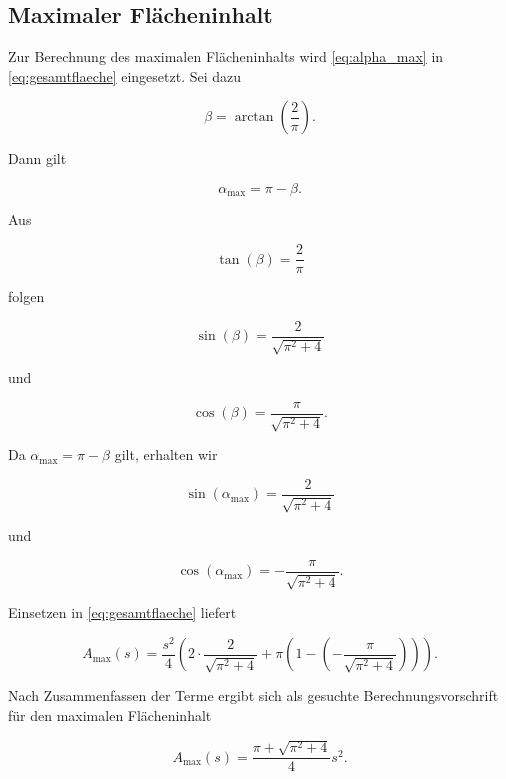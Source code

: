 \subsection{Maximaler Flächeninhalt}

Zur Berechnung des maximalen Flächeninhalts wird
\eqref{eq:alpha_max} in \eqref{eq:gesamtflaeche} eingesetzt. Sei dazu

\begin{equation}
    \beta
    =
    \arctan\left(\frac{2}{\pi}\right).
\end{equation}

Dann gilt

\begin{equation}
    \alpha_{\max}
    =
    \pi-\beta.
\end{equation}

Aus

\begin{equation}
    \tan(\beta)=\frac{2}{\pi}
\end{equation}

folgen

\begin{equation}
    \sin(\beta)
    =
    \frac{2}{\sqrt{\pi^2+4}}
\end{equation}

und

\begin{equation}
    \cos(\beta)
    =
    \frac{\pi}{\sqrt{\pi^2+4}}.
\end{equation}

Da \(\alpha_{\max}=\pi-\beta\) gilt, erhalten wir

\begin{equation}
    \sin(\alpha_{\max})
    =
    \frac{2}{\sqrt{\pi^2+4}}
\end{equation}

und

\begin{equation}
    \cos(\alpha_{\max})
    =
    -\frac{\pi}{\sqrt{\pi^2+4}}.
\end{equation}

Einsetzen in \eqref{eq:gesamtflaeche} liefert

\begin{equation}
    A_{\max}(s)
    =
    \frac{s^2}{4}
    \left(
        2\cdot \frac{2}{\sqrt{\pi^2+4}}
        +
        \pi
        \left(
            1
            -
            \left(
                -\frac{\pi}{\sqrt{\pi^2+4}}
            \right)
        \right)
    \right).
\end{equation}

Nach Zusammenfassen der Terme ergibt sich als gesuchte Berechnungsvorschrift für den maximalen Flächeninhalt

\begin{equation}
    A_{\max}(s)
    =
    \frac{\pi+\sqrt{\pi^2+4}}{4}s^2.
    \label{eq:a_max}
\end{equation}


